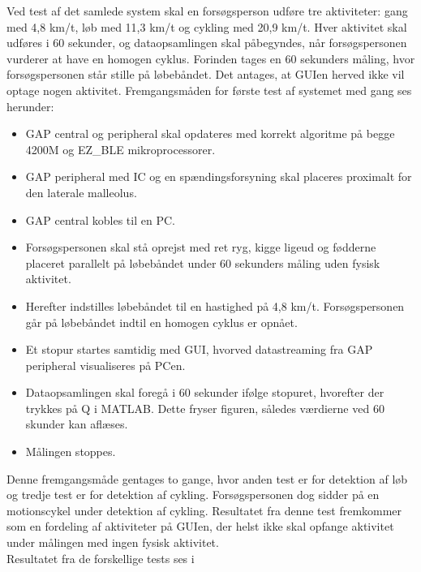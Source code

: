 Ved test af det samlede system skal en forsøgsperson udføre tre aktiviteter: gang med 4,8 km/t, løb med 11,3 km/t og cykling med 20,9 km/t. Hver aktivitet skal udføres i 60 sekunder, og dataopsamlingen skal påbegyndes, når forsøgspersonen vurderer at have en homogen cyklus. Forinden tages en 60 sekunders måling, hvor forsøgspersonen står stille på løbebåndet. Det antages, at GUIen herved ikke vil optage nogen aktivitet. Fremgangsmåden for første test af systemet med gang ses herunder: 
\begin{itemize}
	\item GAP central og peripheral skal opdateres med korrekt algoritme på begge 4200M og EZ\_BLE mikroprocessorer.
	\item GAP peripheral med IC og en spændingsforsyning skal placeres proximalt for den laterale malleolus.
	\item GAP central kobles til en PC. 
	\item Forsøgspersonen skal stå oprejst med ret ryg, kigge ligeud og fødderne placeret parallelt på løbebåndet under 60 sekunders måling uden fysisk aktivitet.
	\item Herefter indstilles løbebåndet til en hastighed på 4,8 km/t. Forsøgspersonen går på løbebåndet indtil en homogen cyklus er opnået.  
	\item Et stopur startes samtidig med GUI, hvorved datastreaming fra GAP peripheral visualiseres på PCen.
	\item Dataopsamlingen skal foregå i 60 sekunder ifølge stopuret, hvorefter der trykkes på Q i MATLAB. Dette fryser figuren, således værdierne ved 60 skunder kan aflæses.
	\item Målingen stoppes.
\end{itemize}
Denne fremgangsmåde gentages to gange, hvor anden test er for detektion af løb og tredje test er for detektion af cykling. Forsøgspersonen dog sidder på en motionscykel under detektion af cykling. Resultatet fra denne test fremkommer som en fordeling af aktiviteter på GUIen, der helst ikke skal opfange aktivitet under målingen med ingen fysisk aktivitet. \\
Resultatet fra de forskellige tests ses i 
